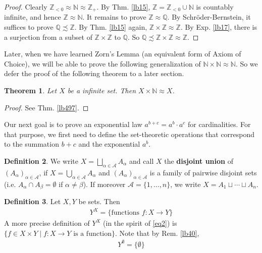 \documentclass[12pt,b5paper,notitlepage]{article}
\theoremstyle{definition}
\newtheorem{df}{Definition}[section]
\theoremstyle{plain}
\newtheorem{thm}[df]{Theorem}
\newcommand{\scr}{\mathscr}
\newcommand{\Nbb}{\mathbb N}
\newcommand{\Zbb}{\mathbb Z}
\newcommand{\Qbb}{\mathbb Q}
\numberwithin{equation}{section}
\begin{document}
\begin{proof}
Clearly $\Zbb_{<0}\approx\Nbb\approx \Zbb_+$. By Thm. \ref{lb15}, $\Zbb=\Zbb_{<0}\cup\Nbb$ is countably infinite, and hence $\Zbb\approx\Nbb$. It remains to prove $\Zbb\approx\Qbb$. By Schr\"oder-Bernstein, it suffices to prove $\Qbb\precsim\Zbb$.  By Thm. \ref{lb15} again, $\Zbb\times\Zbb\approx\Zbb$. By Exp. \ref{lb17}, there is a surjection from a subset of $\Zbb\times\Zbb$ to $\Qbb$. So $\Qbb\precsim\Zbb\times\Zbb\approx\Zbb$.
\end{proof}



Later, when we have learned Zorn's Lemma (an equivalent form of Axiom of Choice), we will be able to prove the following generalization of $\Nbb\times\Nbb\approx\Nbb$. So we defer the proof of the following theorem to a later section.

\begin{thm}\label{lb16}
Let $X$ be a infinite set. Then $X\times\Nbb\approx X$.
\end{thm}

\begin{proof}
See Thm. \ref{lb497}.
\end{proof}



Our next goal is to prove an exponential law $a^{b+c}=a^b\cdot a^c$ for cardinalities. For that purpose, we first need to define the set-theoretic operations that correspond to the summation $b+c$ and the exponential $a^b$.


\begin{df}
We write $X=\bigsqcup_{\alpha\in\scr A}A_\alpha$ \index{zz@$\bigsqcup_{\alpha\in\scr A}A_\alpha$, the disjoint union} and call $X$ the \textbf{disjoint union}  of $(A_\alpha)_{\alpha\in\scr A}$,  if $X=\bigcup_{\alpha\in\scr A}A_\alpha$ and $(A_\alpha)_{\alpha\in\scr A}$ is a family of pairwise disjoint sets (i.e. $A_\alpha\cap A_\beta=\emptyset$ if $\alpha\neq\beta$). If moreover $\scr A=\{1,\dots,n\}$, we write $X=A_1\sqcup\cdots\sqcup A_n$.
\end{df}

\begin{df}
Let $X,Y$ be sets. Then 
\begin{align}
Y^X=\{\text{functions }f:X\rightarrow Y\}
\end{align}
A more precise definition of $Y^X$ (in the spirit of \eqref{eq2}) is $\{f\in X\times Y \mid f:X\rightarrow Y\text{ is a function}\}$. Note that by Rem. \ref{lb40},
\begin{align}
Y^\emptyset=\{\emptyset\}  \label{eq10}
\end{align}
\end{df}
\end{document}
